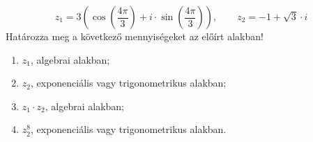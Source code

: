 \documentclass[11pt]{scrartcl}
\begin{document}
\[
	z_1 = 3 \left(
	\cos\left(\frac{4\pi}{3}\right) + i \cdot \sin\left(\frac{4\pi}{3}\right)
	\right), \qquad
	z_2 = -1 + \sqrt{3} \cdot i
\]
Határozza meg a következő mennyiségeket az előírt alakban!
\begin{enumerate}
	\item $z_1$, algebrai alakban;

	\item $z_2$, exponenciális vagy trigonometrikus alakban;

	\item $z_1 \cdot z_2$, algebrai alakban;

	\item $z_2^{8}$, exponenciális vagy trigonometrikus alakban.
\end{enumerate}
\end{document}
